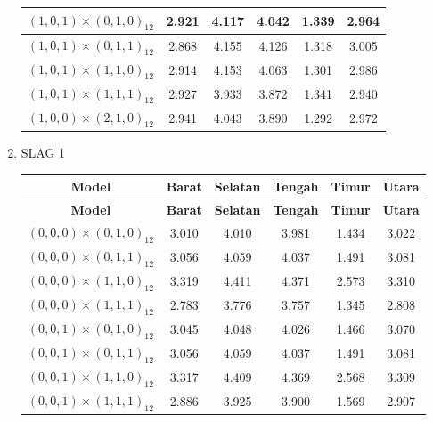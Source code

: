 \begin{enumerate}[label=\alph*.]
\begin{longtable}{|c|c|c|c|c|c|}
        {$(1,0,1) \times (0,1,0)_{12}$} & 2.921 & 4.117 & 4.042 & 1.339 & 2.964 \\ \hline
        {$(1,0,1) \times (0,1,1)_{12}$} & 2.868 & 4.155 & 4.126 & 1.318 & 3.005 \\ \hline
        {$(1,0,1) \times (1,1,0)_{12}$} & 2.914 & 4.153 & 4.063 & 1.301 & 2.986 \\ \hline
        {$(1,0,1) \times (1,1,1)_{12}$} & 2.927 & 3.933 & 3.872 & 1.341 & 2.940 \\ \hline

        {$(1,0,0) \times (2,1,0)_{12}$} & 2.941 & 4.043 & 3.890 & 1.292 & 2.972 \\ \hline

    \end{longtable}

    \item SLAG 1
    \begin{longtable}{|c|c|c|c|c|c|}
        \hline
        \textbf{Model} & \textbf{Barat} & \textbf{Selatan} & \textbf{Tengah} & \textbf{Timur} & \textbf{Utara} \\
        \hline
        \endfirsthead

        \hline
        \textbf{Model} & \textbf{Barat} & \textbf{Selatan} & \textbf{Tengah} & \textbf{Timur} & \textbf{Utara} \\
        \hline
        \endhead

        \hline
        \endfoot
        \hline
        \endlastfoot

        {$(0,0,0) \times (0,1,0)_{12}$} & 3.010 & 4.010 & 3.981 & 1.434 & 3.022 \\ \hline
        {$(0,0,0) \times (0,1,1)_{12}$} & 3.056 & 4.059 & 4.037 & 1.491 & 3.081 \\ \hline
        {$(0,0,0) \times (1,1,0)_{12}$} & 3.319 & 4.411 & 4.371 & 2.573 & 3.310 \\ \hline
        {$(0,0,0) \times (1,1,1)_{12}$} & 2.783 & 3.776 & 3.757 & 1.345 & 2.808 \\ \hline

        {$(0,0,1) \times (0,1,0)_{12}$} & 3.045 & 4.048 & 4.026 & 1.466 & 3.070 \\ \hline
        {$(0,0,1) \times (0,1,1)_{12}$} & 3.056 & 4.059 & 4.037 & 1.491 & 3.081 \\ \hline
        {$(0,0,1) \times (1,1,0)_{12}$} & 3.317 & 4.409 & 4.369 & 2.568 & 3.309 \\ \hline
        {$(0,0,1) \times (1,1,1)_{12}$} & 2.886 & 3.925 & 3.900 & 1.569 & 2.907 \\ \hline


\end{longtable}
\end{enumerate}
